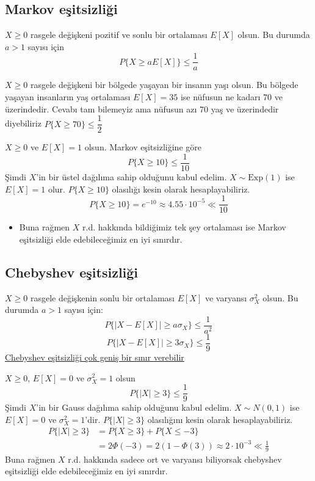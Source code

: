 \documentclass[11pt,a4paper]{article}
\begin{document}
\subsection{Markov eşitsizliği}
$X\ge0$ rasgele değişkeni pozitif ve sonlu bir ortalaması $E[X]$ olsun. Bu durumda $a>1$ sayısı için
\[ P\{X\ge aE[X]\}\le\frac{1}{a} \]
\begin{ornek}
  $X\ge0$ rasgele değişkeni bir bölgede yaşayan bir insanın yaşı olsun. Bu bölgede yaşayan insanların yaş ortalaması $E[X]=35$ ise nüfusun ne kadarı 70 ve üzerindedir. Cevabı tam bilemeyiz ama nüfusun  azı 70 yaş ve üzerindedir diyebiliriz $P\{X\ge70\}\le\dfrac{1}{2}$
\end{ornek}
\begin{ornek}
  $X\ge0$ ve $E[X]=1$ olsun. Markov eşitsizliğine göre
  \[ P\{X\ge10\}\le\frac{1}{10} \]
  Şimdi $X$'in bir üstel dağılıma sahip olduğunu kabul edelim. $X\sim\mathrm{Exp}(1)$ ise $E[X]=1$ olur. $P\{X\ge10\}$ olasılığı kesin olarak hesaplayabiliriz.
  \[ P\{X\ge10\}=e^{-10}\approx4.55\cdot10^{-5}\ll\frac{1}{10} \]
\end{ornek}
\begin{itemize}
  \item Buna rağmen $X$ r.d. hakkında bildiğimiz tek şey ortalaması ise Markov eşitsizliği elde edebileceğimiz en iyi sınırdır.
\end{itemize}

\subsection{Chebyshev eşitsizliği}
$X\ge0$ rasgele değişkenin sonlu bir ortalaması $E[X]$ ve varyansı $\sigma_X^2$ olsun. Bu durumda $a>1$ sayısı için:
\[ P\{|X-E[X]|\ge a\sigma_X\}\le\frac{1}{a^2} \]
\[ P\{|X-E[X]|\ge3\sigma_X\}\le\frac{1}{9} \]
\underline{Chebyshev eşitsizliği çok geniş bir sınır verebilir}

$X\ge0$, $E[X]=0$ ve $\sigma_X^2=1$ olsun
\[ P\{|X|\ge3\}\le\frac{1}{9} \]
Şimdi $X$'in bir Gauss dağılıma sahip olduğunu kabul edelim. $X\sim N(0,1)$ ise $E[X]=0$ ve $\sigma_X^2=1$'dir. $P\{|X|\ge3\}$ olasılığını kesin olarak hesaplayabiliriz.
\begin{align*}
  P\{|X|\ge3\} &= P\{X\ge3\}+P\{X\le-3\}\\
  &= 2\Phi(-3)=2(1-\Phi(3))\approx2\cdot10^{-3}\ll\frac{1}{9}
\end{align*}
Buna rağmen $X$ r.d. hakkında sadece ort ve varyansı biliyorsak chebyshev eşitsizliği elde edebileceğimiz en iyi sınırdır.
\end{document}

